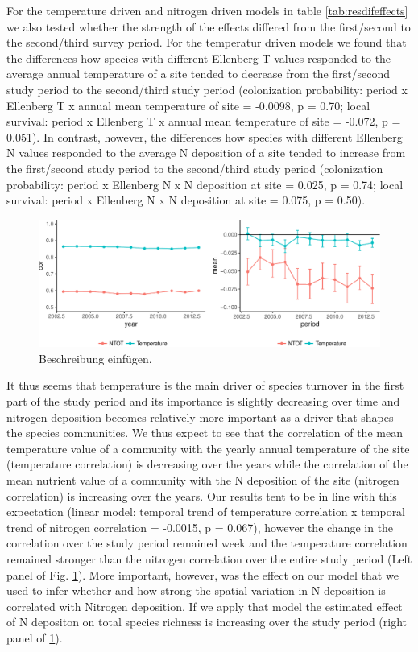 \documentclass[fleqn,10pt,lineno]{wlpeerj} %
\begin{document}
For the temperature driven and nitrogen driven models in table
\ref{tab:resdifeffects} we also tested whether the strength of the
effects differed from the first/second to the second/third survey
period. For the temperatur driven models we found that the differences
how species with different Ellenberg T values responded to the average
annual temperature of a site tended to decrease from the first/second
study period to the second/third study period (colonization probability:
period x Ellenberg T x annual mean temperature of site = -0.0098, p =
0.70; local survival: period x Ellenberg T x annual mean temperature of
site = -0.072, p = 0.051). In contrast, however, the differences how
species with different Ellenberg N values responded to the average N
deposition of a site tended to increase from the first/second study
period to the second/third study period (colonization probability:
period x Ellenberg N x N deposition at site = 0.025, p = 0.74; local
survival: period x Ellenberg N x N deposition at site = 0.075, p =
0.50).

\begin{figure}
\includegraphics[width=1\linewidth]{Manuscript_files/figure-latex/figconsequences-1} \caption{Beschreibung einfügen.}\label{fig:figconsequences}
\end{figure}

It thus seems that temperature is the main driver of species turnover in
the first part of the study period and its importance is slightly
decreasing over time and nitrogen deposition becomes relatively more
important as a driver that shapes the species communities. We thus
expect to see that the correlation of the mean temperature value of a
community with the yearly annual temperature of the site (temperature
correlation) is decreasing over the years while the correlation of the
mean nutrient value of a community with the N deposition of the site
(nitrogen correlation) is increasing over the years. Our results tent to
be in line with this expectation (linear model: temporal trend of
temperature correlation x temporal trend of nitrogen correlation =
-0.0015, p = 0.067), however the change in the correlation over the
study period remained week and the temperature correlation remained
stronger than the nitrogen correlation over the entire study period
(Left panel of Fig. \ref{fig:figconsequences}). More important, however,
was the effect on our model that we used to infer whether and how strong
the spatial variation in N deposition is correlated with Nitrogen
deposition. If we apply that model the estimated effect of N depositon
on total species richness is increasing over the study period (right
panel of \ref{fig:figconsequences}).
\end{document}

